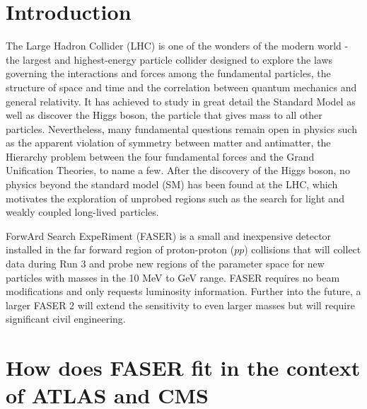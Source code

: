 \section{Introduction} %

The Large Hadron Collider (LHC) is one of the wonders of the modern world - the largest and highest-energy particle collider designed to explore the laws governing the interactions and forces among the fundamental particles, the structure of space and time and the correlation between quantum mechanics and general relativity. It has achieved to study in great detail the Standard Model as well as discover the Higgs boson, the particle that gives mass to all other particles. Nevertheless, many fundamental questions remain open in physics such as the apparent violation of symmetry between matter and antimatter, the Hierarchy problem between the four fundamental forces and the Grand Unification Theories, to name a few.
After the discovery of the Higgs boson, no physics beyond the standard model (SM) has been found at the LHC, which motivates the exploration of unprobed regions such as the search for light and weakly coupled long-lived particles.

ForwArd Search ExpeRiment (FASER) is a small and inexpensive detector installed in the far forward region of proton-proton ($pp$) collisions that will collect data during Run 3 and probe new regions of the parameter space for new particles with masses in the 10 MeV to GeV range.
FASER requires no beam modifications and only requests luminosity  information. Further into the future, a larger
 FASER 2 will extend the sensitivity to even larger masses but will require significant civil engineering.

\section{How does FASER fit in the context of ATLAS and CMS}  %
\label{section1.3}

